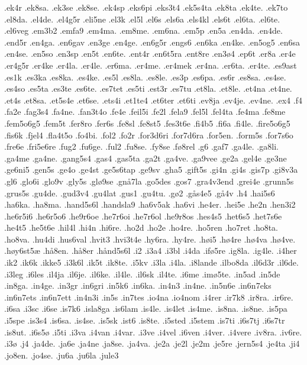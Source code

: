 {.ek4r
.ek8sa.
.ek3se
.ek8se.
.ek4sp
.eks6pi
.eks3t4
.ek5s4ta
.ek8ta
.ek4te.
.ek7to
.el8da.
.el4de.
.el4g5r
.eli5ne
.el3k
.el5l
.el6s
.els6a
.els4kl
.els6t
.el6ta.
.el6te.
.el6veg
.em3b2
.emfa9
.em4ma.
.em8me.
.em6na.
.em5p
.en5a
.en4da.
.en4de.
.end5r
.en4ga.
.en6gav
.en3ge
.en4ge.
.en6g5r
.engs6
.en6ka
.en4ke.
.en5og5
.en6sa
.en4se.
.en5so
.en3sp
.en5t
.en6te.
.ent4r
.en6t5ra
.ent8re
.en3ø4
.ep6t
.er8a
.er4e
.er4g5r
.er4ke
.er4la.
.er4le.
.er6ma.
.er4me.
.er4mek
.er4na.
.er6ta.
.er4te.
.es9ast
.es1k
.es3ka
.es8ka.
.es4ke.
.es5l
.es8la.
.es8le.
.es3p
.es6pa.
.es6r
.es8sa.
.es4se.
.es4so
.es5ta
.es3te
.es6te.
.es7tet
.es5ti
.est3r
.es7tu
.et8la.
.et8le.
.et4na
.et4ne.
.et4s
.et8sa.
.et5s4e
.et6se.
.ets4i
.et1te4
.et6ter
.et6ti
.ev8ja
.ev4je.
.ev4ne.
.ex4
.f4
.fa2e
.fag3s4
.fa4ne.
.fan3t4o
.fe4e
.feil5i
.fe2l
.fela9
.fel5l
.fel4ta
.fe4ma
.fe8me
.fem5o6g5
.fem5t
.fer8ro
.fer6s
.fe8sl
.fe8st5
.fes3t6e
.fi4b5
.fi6a
.fi4le.
.fire5o6g5
.fis6k
.fjel4
.fla4t5o
.fo4bi.
.fol2
.fo2r
.for3d6ri
.for7d6ra
.for5en.
.form5s
.for7s6o
.fre6e
.fri5e6re
.fug2
.fu6ge.
.ful2
.fu8se.
.fy8se
.fø8rel
.g6
.gaf7
.ga4le.
.ga8li.
.ga4me
.ga4ne.
.gang5s4
.gas4
.gas5ta
.ga2t
.ga4ve.
.ga9vee
.ge2a
.gel4e
.ge3ne
.ge6ni5
.gen5s
.ge4o
.ge4st
.ge5s6tap
.ge9sv
.gha5
.gift5s
.gi4n
.gi4s
.gis7p
.gi8v3a
.gl6
.glo6i
.glo9v
.gly5s
.glø9se
.gnå7la
.go5des
.gos7
.gra4v3end
.grei4e
.grunn5s
.grus5s
.gu4de.
.gud3v4
.gu4lat
.gus1
.gu4tu.
.gø2
.gås4e5
.gå4v
.h4
.hai5s6
.ha6ka.
.ha8ma.
.hand5s6l
.handsla9
.ha6v5ak
.ha6vi
.he4er.
.hei5e
.he2n
.hen3i2
.he6r5i6
.he6r5o6
.he9r6oe
.he7r6oi
.he7r6ol
.he9r8os
.hes4s5
.het6s5
.het7s6e
.he4t5
.he5t6e
.hil4l
.hi4n
.hi6re.
.ho2d
.ho2e
.ho4re.
.ho5ren
.ho7ret
.ho8ta.
.ho8va.
.hu4di
.hus6val
.hvit3
.hvi3t4e
.hy6ra.
.hy4re.
.høi5
.hø4re
.hø4va
.hø4ve.
.høy6st5æ
.hå8en.
.hå8er
.hånd5s6l
.i2
.i3a4
.i3bl
.i4da
.ifø5re
.ig8la.
.ig4le.
.i4her
.ik2
.ik6k
.ikke5
.i3k6l
.ik5t
.ik8te.
.i5kv
.i3la
.i4la.
.i8lande
.ilbo8da
.il6d3r
.il6de.
.i3leg
.i6les
.il4ja
.il6je.
.il6ke.
.il4le.
.il6sk
.il4te.
.i6me
.imø5te.
.in5ad
.in5de
.in8ga.
.in4ge.
.in3gr
.in6gri
.in5k6
.in6ka.
.in4n3
.in4ne.
.in5n6e
.in6n7eks
.in6n7ets
.in6n7ett
.in4n3i
.in5s
.in7tes
.io4na
.io4nom
.i4rer
.ir7k8
.ir8ra.
.ir6re.
.i6sa
.i3sc
.i6se
.is7k6
.isla8ga
.is6lam
.is4le.
.is4let
.is4me.
.is8na.
.is8ne.
.is5pa
.i5spe
.is3s4
.is6sa.
.is4se.
.is5sk
.ist6
.is8te.
.i5sted
.i5stem
.is7ti
.i6s7tj
.i6s7tr
.is8ut.
.i6s5ø
.i5ti
.i3va
.i4van
.i4var.
.i3ve
.i4vel
.i6ven
.i4ver.
.i4vere
.iv8ra.
.iv6re.
.i3ø
.j4
.ja4de.
.ja6e
.ja4ne
.ja8se.
.ja4va.
.je2a
.je2l
.je2m
.je5re
.jern5s4
.je4ta
.ji4
.jo8en.
.jo4se.
.ju6a
.ju6la
.jule3
}
